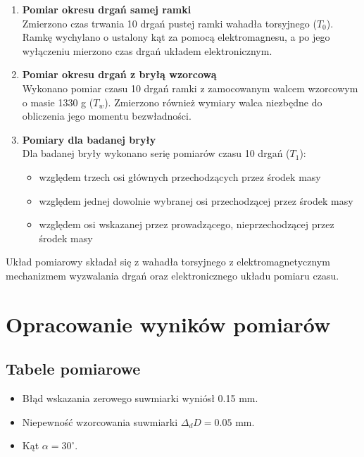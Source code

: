 \documentclass[a4paper,12pt]{article}
\begin{document}
\begin{enumerate}
    \item \textbf{Pomiar okresu drgań samej ramki} \\
          Zmierzono czas trwania 10 drgań pustej ramki wahadła torsyjnego ($T_0$). Ramkę wychylano o ustalony kąt za pomocą elektromagnesu, a po jego wyłączeniu mierzono czas drgań układem elektronicznym.

    \item \textbf{Pomiar okresu drgań z bryłą wzorcową} \\
          Wykonano pomiar czasu 10 drgań ramki z zamocowanym walcem wzorcowym o masie 1330 g ($T_w$). Zmierzono również wymiary walca niezbędne do obliczenia jego momentu bezwładności.

    \item \textbf{Pomiary dla badanej bryły} \\
          Dla badanej bryły wykonano serię pomiarów czasu 10 drgań ($T_1$):
          \begin{itemize}
              \item względem trzech osi głównych przechodzących przez środek masy
              \item względem jednej dowolnie wybranej osi przechodzącej przez środek masy
              \item względem osi wskazanej przez prowadzącego, nieprzechodzącej przez środek masy
          \end{itemize}
\end{enumerate}

Układ pomiarowy składał się z wahadła torsyjnego z elektromagnetycznym mechanizmem wyzwalania drgań oraz elektronicznego układu pomiaru czasu.

\section{Opracowanie wyników pomiarów}

\subsection{Tabele pomiarowe}

\begin{itemize}
    \item Błąd wskazania zerowego suwmiarki wyniósł 0.15 mm.
    \item Niepewność wzorcowania suwmiarki $\Delta_d D = 0.05$ mm.
    \item Kąt $\alpha = 30^\circ$.
\end{itemize}
\end{document}
